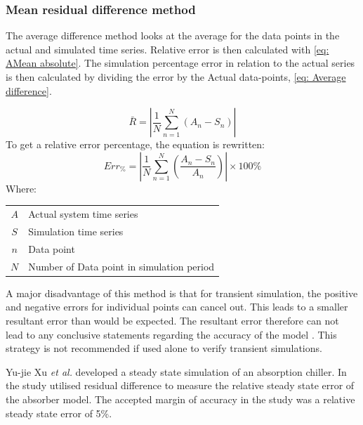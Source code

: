 		\subsubsection{Mean residual difference method}
 			The average difference method looks at the average for the data points in the actual and simulated time series.  Relative error is then calculated with \cref{eq: AMean absolute}. The simulation percentage error in relation to the actual series is then calculated by dividing the error by the Actual data-points, \cref{eq: Average difference}.
 			
 			\begin{equation}
 			\label{eq: AMean absolute}
 			\bar{R} = \left| \dfrac{1}{N} \sum_{n=1}^{N}{ \left( A_{n} - S_{n}\right)}  \right|
 			\end{equation}
To get a relative error percentage, the equation is rewritten:	
 			\begin{equation}
 				\label{eq: Average difference}
 				Err_{\%} = \left| \dfrac{1}{N} \sum_{n=1}^{N}{ \left(\dfrac{ A_{n} - S_{n}}{A_n}\right)}  \right| \times 100 \%
 			\end{equation}
 			Where: \par 
 				\begin{table}[h!]
 					\centering
 					\begin{tabular}{cl}
 						$A$ & Actual system time series \\
 						$S$ & Simulation time series \\
 						$n$ & Data point \\
 						$N$ & Number of Data point in simulation period \\
 					\end{tabular} 
 				\end{table}	
 			A major disadvantage of this method is that for transient simulation, the positive and negative errors for individual points can cancel out. This leads to a smaller resultant error than would be expected. The resultant error therefore can not lead to any conclusive statements regarding the accuracy of the model \cite{sarin2010comparing}.  This strategy is not recommended if used alone to verify transient simulations. 
 			\par 
 						
 			Yu-jie Xu \textit{et al.} \cite{xu2016modeling} developed a steady state simulation of an absorption chiller. In the study \cite{xu2016modeling} utilised  residual difference to measure the relative steady state error of the absorber model. The accepted margin of accuracy in the study was a relative steady state error of 5\%. 
 			
